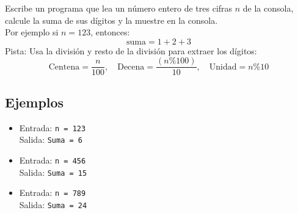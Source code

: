 Escribe un programa que lea un número entero de tres cifras \(n\) de la consola, calcule la suma de sus dígitos y la muestre en la consola.\\
Por ejemplo si \(n = 123\), entonces:
\[
\text{suma} = 1 + 2 + 3
\]
Pista: Usa la división y resto de la división para extraer los dígitos:
\[
\text{Centena} = \frac{n}{100}, \quad \text{Decena} = \frac{(n \% 100)}{10}, \quad \text{Unidad} = n \% 10
\]
\subsection*{Ejemplos}
\begin{itemize}
    \item Entrada: \texttt{n = 123}\\
          Salida: \texttt{Suma = 6}
    \item Entrada: \texttt{n = 456}\\
          Salida: \texttt{Suma = 15}
    \item Entrada: \texttt{n = 789}\\
          Salida: \texttt{Suma = 24}
\end{itemize}